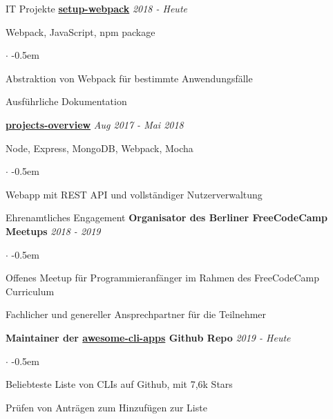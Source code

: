 \documentclass{cv}
\begin{document}
\begin{rSection}{IT Projekte}
  \textbf{\href{https://github.com/jneidel/setup-webpack}{setup-webpack}}
  \hfill
  {\em 2018 - Heute}

  Webpack, JavaScript, npm package
  \begin{list}{$\cdot$}{}
    \itemsep -0.5em \vspace{-0.5em}
    \smallskip
    \item Abstraktion von Webpack für bestimmte Anwendungsfälle
    \item Ausführliche Dokumentation
  \end{list}

  \textbf{\href{https://github.com/jneidel/projects-overview}{projects-overview}}
  \hfill
  {\em Aug 2017 - Mai 2018}

  Node, Express, MongoDB, Webpack, Mocha
  \begin{list}{$\cdot$}{}
    \itemsep -0.5em \vspace{-0.5em}
    \smallskip
    \item Webapp mit REST API und vollständiger Nutzerverwaltung
  \end{list}



\end{rSection}

\begin{rSection}{Ehrenamtliches Engagement}
  {\bf Organisator des Berliner FreeCodeCamp Meetups}
  \hfill
  {\em 2018 - 2019}

  \begin{list}{$\cdot$}{}
    \itemsep -0.5em \vspace{-0.5em}
    \smallskip
    \item Offenes Meetup für Programmieranfänger im Rahmen des FreeCodeCamp Curriculum
    \item Fachlicher und genereller Ansprechpartner für die Teilnehmer
  \end{list}

  {\bf Maintainer der \href{https://github.com/agarrharr/awesome-cli-apps}{awesome-cli-apps} Github Repo}
  \hfill
  {\em 2019 - Heute}

  \begin{list}{$\cdot$}{}
    \itemsep -0.5em \vspace{-0.5em}
    \smallskip
    \item Beliebteste Liste von CLIs auf Github, mit 7,6k Stars
    \item Prüfen von Anträgen zum Hinzufügen zur Liste
  \end{list}
\end{rSection}
\end{document}
